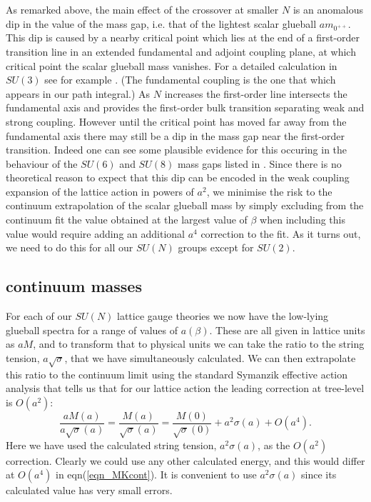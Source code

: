 \documentclass[12pt]{article}
\newcommand{\be}{\begin{equation}}
\newcommand{\ee}{\end{equation}}
\begin{document}
As remarked above, the main effect of the crossover at smaller $N$ is an anomalous
dip in the value of the mass gap, i.e. that of the lightest scalar glueball $am_{0^{++}}$.
This dip is caused by a nearby critical point which lies at the end of a first-order
transition line in an extended fundamental and adjoint coupling plane,
at which critical point the scalar glueball mass vanishes. For a detailed
calculation in $SU(3)$ see for example
%
\cite{Heller_bulk}.
%
(The fundamental coupling is the one that which appears in our path integral.)
As $N$ increases the first-order line intersects the fundamental axis and provides the
first-order bulk transition separating weak and strong coupling.
However until the critical point has moved far away from the fundamental
axis there may still be a dip in the mass gap near the first-order transition.
Indeed one can see some plausible evidence for this occuring in the behaviour of
the $SU(6)$ and $SU(8)$ mass gaps listed in 
%
\cite{BLMTUW_N}.
%
Since there is no theoretical reason to expect that this dip can be encoded in
the weak coupling expansion of the lattice action in powers of $a^2$, we minimise
the risk to the continuum extrapolation of the scalar glueball mass by simply excluding
from the continuum fit the value obtained at the largest value of $\beta$ when
including this value would require adding an additional $a^4$ correction to the fit.
As it turns out, we need to do this for all our $SU(N)$ groups except for $SU(2)$.


%
%
\subsection{continuum masses}
\label{subsection_massratios} 

For each of our $SU(N)$ lattice gauge theories  we now have the low-lying glueball spectra
for a range of values of $a(\beta)$. These are all given in lattice units as $aM$, and to
transform that to physical units we can take the ratio to the string tension, $a\surd\sigma$,
that we have simultaneously calculated. We can then extrapolate this ratio to the
continuum limit using the standard Symanzik effective action analysis
%
\cite{Symanzik_cont}
%
that tells us that for our lattice action the leading correction at tree-level is $O(a^2)$:
%
\be
\frac{aM(a)}{a\surd\sigma(a)} = \frac{M(a)}{\surd\sigma(a)}
=
\frac{M(0)}{\surd\sigma(0)} + a^2\sigma(a) + O(a^4).
\label{eqn_MKcont}
\ee
%
Here we have used the calculated string tension, $a^2\sigma(a)$, as the $O(a^2)$
correction. Clearly we could use any other calculated energy, and this would
differ at $O(a^4)$ in eqn(\ref{eqn_MKcont}). It is convenient to use $a^2\sigma(a)$
since its calculated value has very small errors.
\end{document}
